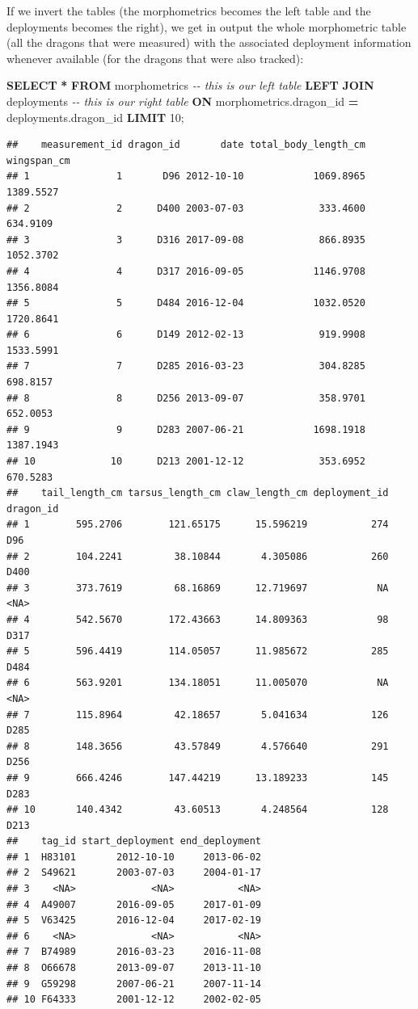 \documentclass[
]{book}
\newenvironment{Shaded}{\begin{snugshade}}{\end{snugshade}}
\newcommand{\CommentTok}[1]{\textcolor[rgb]{0.56,0.35,0.01}{\textit{#1}}}
\newcommand{\DecValTok}[1]{\textcolor[rgb]{0.00,0.00,0.81}{#1}}
\newcommand{\KeywordTok}[1]{\textcolor[rgb]{0.13,0.29,0.53}{\textbf{#1}}}
\newcommand{\NormalTok}[1]{#1}
\newcommand{\OperatorTok}[1]{\textcolor[rgb]{0.81,0.36,0.00}{\textbf{#1}}}
\begin{document}
If we invert the tables (the morphometrics becomes the left table and the
deployments becomes the right), we get in output the whole morphometric table
(all the dragons that were measured) with the associated deployment information
whenever available (for the dragons that were also tracked):

\begin{Shaded}
\begin{Highlighting}[]
\KeywordTok{SELECT} \OperatorTok{*}
\KeywordTok{FROM}\NormalTok{ morphometrics }\CommentTok{{-}{-} this is our left table}
\KeywordTok{LEFT} \KeywordTok{JOIN}\NormalTok{ deployments }\CommentTok{{-}{-} this is our right table }
\KeywordTok{ON}\NormalTok{ morphometrics.dragon\_id }\OperatorTok{=}\NormalTok{ deployments.dragon\_id }
\KeywordTok{LIMIT} \DecValTok{10}\NormalTok{;}
\end{Highlighting}
\end{Shaded}

\begin{verbatim}
##    measurement_id dragon_id       date total_body_length_cm wingspan_cm
## 1               1       D96 2012-10-10            1069.8965   1389.5527
## 2               2      D400 2003-07-03             333.4600    634.9109
## 3               3      D316 2017-09-08             866.8935   1052.3702
## 4               4      D317 2016-09-05            1146.9708   1356.8084
## 5               5      D484 2016-12-04            1032.0520   1720.8641
## 6               6      D149 2012-02-13             919.9908   1533.5991
## 7               7      D285 2016-03-23             304.8285    698.8157
## 8               8      D256 2013-09-07             358.9701    652.0053
## 9               9      D283 2007-06-21            1698.1918   1387.1943
## 10             10      D213 2001-12-12             353.6952    670.5283
##    tail_length_cm tarsus_length_cm claw_length_cm deployment_id dragon_id
## 1        595.2706        121.65175      15.596219           274       D96
## 2        104.2241         38.10844       4.305086           260      D400
## 3        373.7619         68.16869      12.719697            NA      <NA>
## 4        542.5670        172.43663      14.809363            98      D317
## 5        596.4419        114.05057      11.985672           285      D484
## 6        563.9201        134.18051      11.005070            NA      <NA>
## 7        115.8964         42.18657       5.041634           126      D285
## 8        148.3656         43.57849       4.576640           291      D256
## 9        666.4246        147.44219      13.189233           145      D283
## 10       140.4342         43.60513       4.248564           128      D213
##    tag_id start_deployment end_deployment
## 1  H83101       2012-10-10     2013-06-02
## 2  S49621       2003-07-03     2004-01-17
## 3    <NA>             <NA>           <NA>
## 4  A49007       2016-09-05     2017-01-09
## 5  V63425       2016-12-04     2017-02-19
## 6    <NA>             <NA>           <NA>
## 7  B74989       2016-03-23     2016-11-08
## 8  O66678       2013-09-07     2013-11-10
## 9  G59298       2007-06-21     2007-11-14
## 10 F64333       2001-12-12     2002-02-05
\end{verbatim}
\end{document}
